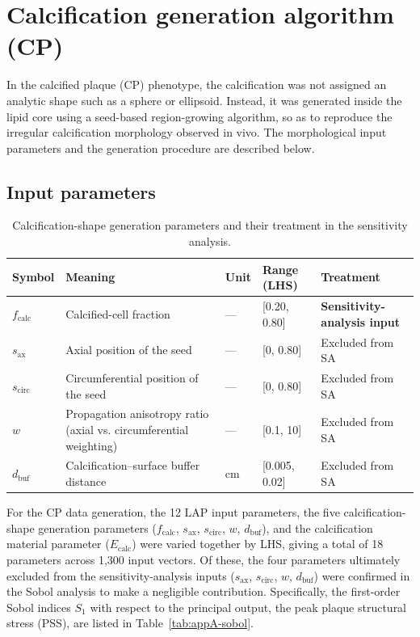 \documentclass[master,english,final]{kaist-ucs}
\begin{document}
\chapter{Calcification generation algorithm (CP)}

In the calcified plaque (CP) phenotype, the calcification was not assigned an analytic shape such as a sphere or ellipsoid. Instead, it was generated inside the lipid core using a seed-based region-growing algorithm, so as to reproduce the irregular calcification morphology observed in vivo. The morphological input parameters and the generation procedure are described below.

\section{Input parameters}

\begin{table}[ht]
\caption[Calcification-generation parameters]{Calcification-shape generation parameters and their treatment in the sensitivity analysis.}
\label{tab:appA-params}
\begin{center}
\begin{tabular}{llllp{3.2cm}}
\hline\hline
Symbol & Meaning & Unit & Range (LHS) & Treatment \\
\hline
$f_\mathrm{calc}$ & Calcified-cell fraction & --- & [0.20, 0.80] & \textbf{Sensitivity-analysis input} \\
$s_\mathrm{ax}$ & Axial position of the seed & --- & [0, 0.80] & Excluded from SA \\
$s_\mathrm{circ}$ & Circumferential position of the seed & --- & [0, 0.80] & Excluded from SA \\
$w$ & Propagation anisotropy ratio (axial vs. circumferential weighting) & --- & [0.1, 10] & Excluded from SA \\
$d_\mathrm{buf}$ & Calcification--surface buffer distance & cm & [0.005, 0.02] & Excluded from SA \\
\hline\hline
\end{tabular}
\end{center}
\end{table}

For the CP data generation, the 12 LAP input parameters, the five calcification-shape generation parameters ($f_\mathrm{calc}$, $s_\mathrm{ax}$, $s_\mathrm{circ}$, $w$, $d_\mathrm{buf}$), and the calcification material parameter ($E_\mathrm{calc}$) were varied together by LHS, giving a total of 18 parameters across 1{,}300 input vectors. Of these, the four parameters ultimately excluded from the sensitivity-analysis inputs ($s_\mathrm{ax}$, $s_\mathrm{circ}$, $w$, $d_\mathrm{buf}$) were confirmed in the Sobol analysis to make a negligible contribution. Specifically, the first-order Sobol indices $S_1$ with respect to the principal output, the peak plaque structural stress (PSS), are listed in Table~\ref{tab:appA-sobol}.
\end{document}
